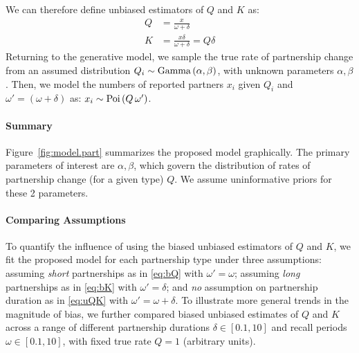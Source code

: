 We can therefore define unbiased estimators of $Q$ and $K$ as:
\begin{subequations}\label{eq:uQK}
\begin{alignat}{1}
  Q &= \frac{x}{\omega + \delta}\\
  K &= \frac{x \delta}{\omega + \delta} = Q \delta
\end{alignat}
\end{subequations}
Returning to the generative model, we sample the true rate of partnership change  %
from an assumed distribution $Q_i \sim \mathrm{Gamma}\,(\alpha,\beta)$,
with unknown parameters $\alpha, \beta$.
Then, we model the numbers of reported partners $x_i$
given $Q_i$ and $\omega' = (\omega + \delta)$ as: $x_i \sim \mathrm{Poi}\,(Q\,\omega')$.
\paragraph{Summary}
Figure~\ref{fig:model.part} summarizes the proposed model graphically.
The primary parameters of interest are $\alpha, \beta$, which govern
the distribution of rates of partnership change (for a given type) $Q$.
We assume uninformative priors for these 2 parameters.
\paragraph{Comparing Assumptions}
To quantify the influence of using
the biased \vs unbiased estimators of $Q$ and $K$,
we fit the proposed model for each partnership type under three assumptions:
assuming \emph{short} partnerships as in \eqref{eq:bQ} with $\omega' = \omega$;
assuming \emph{long} partnerships as in \eqref{eq:bK} with $\omega' = \delta$; and
\emph{no} assumption on partnership duration as in \eqref{eq:uQK} with $\omega' = \omega + \delta$.
To illustrate more general trends in the magnitude of bias,
we further compared biased \vs unbiased estimates of $Q$ and $K$ across a range of different  %
partnership durations $\delta \in [0.1, 10]$ and
recall periods $\omega \in [0.1, 10]$,
with fixed true rate $Q = 1$ (arbitrary units).
